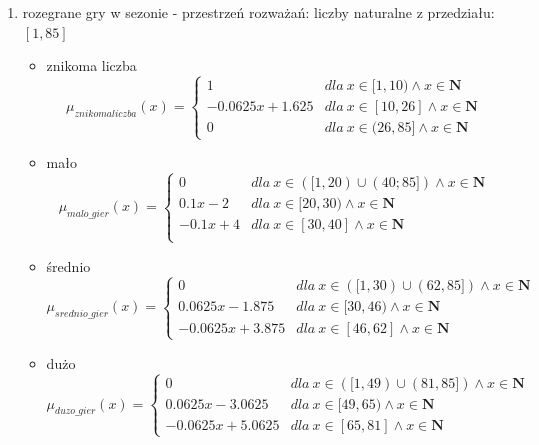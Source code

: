 \documentclass{classrep}
\begin{document}
\begin{enumerate}
    \item rozegrane gry w sezonie - przestrzeń rozważań: liczby naturalne z przedziału: $[1, 85]$
     \begin{itemize}
        \item znikoma liczba
        \begin{equation}
            \mu_{znikomaliczba}(x) = \left\{\begin{matrix} 1 & dla \: x\in[1, 10)  \wedge x\in \mathbf{N} \\ -0.0625x + 1.625 & dla \: x\in [10, 26]  \wedge x\in \mathbf{N} \\ 0 & dla \: x\in (26, 85]  \wedge x\in \mathbf{N} \end{matrix}\right.
        \end{equation}
        \item mało
        \begin{equation}
            \mu_{malo\_gier}(x) = \left\{\begin{matrix}0 & dla \: x\in ([1, 20) \cup (40;85]) \wedge x\in \mathbf{N} \\ 0.1x - 2 & dla \: x\in[20, 30) \wedge x\in \mathbf{N} \\ -0.1x + 4 & dla \: x\in [30, 40] \wedge x\in \mathbf{N}\\ \end{matrix}\right.
        \end{equation}
        \item średnio
        \begin{equation}
            \mu_{srednio\_gier}(x) = \left\{\begin{matrix} 0 & dla \: x\in ([1, 30) \cup (62, 85]) \wedge x\in \mathbf{N} \\ 0.0625x - 1.875 & dla \: x\in[30, 46) \wedge x\in \mathbf{N} \\ -0.0625x + 3.875 & dla \: x\in [46, 62] \wedge x\in \mathbf{N} \end{matrix}\right.
        \end{equation}
        \item dużo
        \begin{equation}
            \mu_{duzo\_gier}(x) = \left\{\begin{matrix} 0 & dla \: x\in ([1, 49) \cup (81, 85])  \wedge x\in \mathbf{N} \\ 0.0625x - 3.0625 & dla \: x\in[49, 65) \wedge x\in \mathbf{N} \\ -0.0625x + 5.0625 & dla \: x\in [65, 81] \wedge x\in \mathbf{N} \end{matrix}\right.

\end{equation}
\end{itemize}
\end{enumerate}
\end{document}
